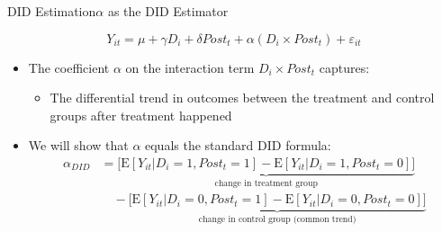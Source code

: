 \documentclass[dvipsnames,hyperref={pdfpagelabels=false}]{beamer}
\begin{document}
\begin{frame}{DID Estimation}{$\alpha$ as the DID Estimator}

\begin{equation*}
    Y_{it} = \mu + \gamma D_{i} + \delta Post_{t} + \alpha (D_{i} \times Post_{t}) + \varepsilon_{it}
\end{equation*}

\begin{itemize}
    \item The coefficient $\alpha$ on the interaction term $D_i \times Post_t$ captures:
            \vspace{0.2cm}

    \begin{itemize}
        \item The differential trend in outcomes between the treatment and control groups after treatment happened
    \end{itemize}
    \vspace{0.2cm}
    \item We will show that $\alpha$ equals the standard DID formula:
    \begin{align*}
        \alpha_{DID} &= \underbrace{\bigl[\mathrm{E}[Y_{it}|D_i=1, Post_t=1] - \mathrm{E}[Y_{it}|D_i=1, Post_t=0]\bigr]}_{\text{change in treatment group}} \\[4pt]
        &\quad - \underbrace{\bigl[\mathrm{E}[Y_{it}|D_i=0, Post_t=1] - \mathrm{E}[Y_{it}|D_i=0, Post_t=0]\bigr]}_{\text{change in control group (common trend)}}
    \end{align*}
\end{itemize}
\end{frame}
\end{document}
